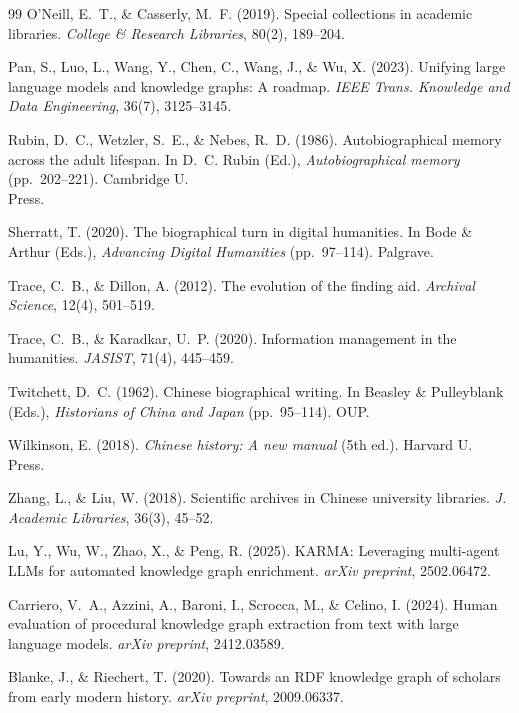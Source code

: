 \documentclass[review]{elsarticle}
\begin{document}
\begin{thebibliography}{99}
O'Neill, E.~T., \& Casserly, M.~F. (2019). Special collections in academic libraries. \emph{College \& Research Libraries}, 80(2), 189--204.

Pan, S., Luo, L., Wang, Y., Chen, C., Wang, J., \& Wu, X. (2023). Unifying large language models and knowledge graphs: A roadmap. \emph{IEEE Trans. Knowledge and Data Engineering}, 36(7), 3125--3145.

Rubin, D.~C., Wetzler, S.~E., \& Nebes, R.~D. (1986). Autobiographical memory across the adult lifespan. In D.~C. Rubin (Ed.), \emph{Autobiographical memory} (pp.~202--221). Cambridge U.\\ Press.

Sherratt, T. (2020). The biographical turn in digital humanities. In Bode \& Arthur (Eds.), \emph{Advancing Digital Humanities} (pp.~97--114). Palgrave.

Trace, C.~B., \& Dillon, A. (2012). The evolution of the finding aid. \emph{Archival Science}, 12(4), 501--519.

Trace, C.~B., \& Karadkar, U.~P. (2020). Information management in the humanities. \emph{JASIST}, 71(4), 445--459.

Twitchett, D.~C. (1962). Chinese biographical writing. In Beasley \& Pulleyblank (Eds.), \emph{Historians of China and Japan} (pp.~95--114). OUP.

Wilkinson, E. (2018). \emph{Chinese history: A new manual} (5th ed.). Harvard U.\\ Press.

Zhang, L., \& Liu, W. (2018). Scientific archives in Chinese university libraries. \emph{J. Academic Libraries}, 36(3), 45--52.

Lu, Y., Wu, W., Zhao, X., \& Peng, R. (2025). KARMA: Leveraging multi-agent LLMs for automated knowledge graph enrichment. \emph{arXiv preprint}, 2502.06472.

Carriero, V.~A., Azzini, A., Baroni, I., Scrocca, M., \& Celino, I. (2024). Human evaluation of procedural knowledge graph extraction from text with large language models. \emph{arXiv preprint}, 2412.03589.

Blanke, J., \& Riechert, T. (2020). Towards an RDF knowledge graph of scholars from early modern history. \emph{arXiv preprint}, 2009.06337.


\end{thebibliography}
\end{document}
